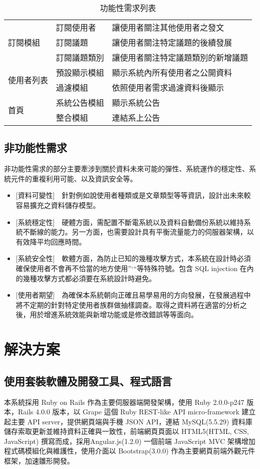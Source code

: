 \documentclass[11pt]{article}
\begin{document}
\begin{table}[t]
\begin{tabular}{ | l | l | l | }
\multirow{3}{*}{訂閱模組}
& 訂閱使用者 & 讓使用者關注其他使用者之發文 \\
& 訂閱議題 & 讓使用者關注特定議題的後續發展 \\
& 訂閱議題類別 & 讓使用者關注特定議題類別的新增議題 \\ \hline
\multirow{2}{*}{使用者列表}
& 預設顯示模組 & 顯示系統內所有使用者之公開資料 \\
& 過濾模組 & 依照使用者需求過濾資料後顯示 \\ \hline
\multirow{2}{*}{首頁}
& 系統公告模組 & 顯示系統公告 \\
& 整合模組 & 連結系上公告 \\ \hline
\end{tabular}
\caption{功能性需求列表}
\label{req}
\end{table}

\subsection{非功能性需求}
非功能性需求的部分主要牽涉到關於資料未來可能的彈性、系統運作的穩定性、系統元件的重複利用可能、以及資訊安全等。
\begin{itemize}
\item{[資料可變性]~~針對例如說使用者種類或是文章類型等等資訊，設計出未來較容易擴充之資料儲存模型。 }
\item{[系統穩定性]~~硬體方面，需配置不斷電系統以及資料自動備份系統以維持系統不斷線的能力。另一方面，也需要設計具有平衡流量能力的伺服器架構，以有效降平均回應時間。}
\item{[系統安全性]~~軟體方面，為防止已知的幾種攻擊方式，本系統在設計時必須確保使用者不會再不恰當的地方使用”‘“等特殊符號。包含 SQL injection 在內的幾種攻擊方式都必須要在系統設計時避免。}
\item{[使用者期望]~~為確保本系統朝向正確且易學易用的方向發展，在發展過程中將不定期的針對特定使用者族群做抽樣調查。取得之資料將在適當的分析之後，用於增進系統效能與新增功能或是修改錯誤等等面向。}
\end{itemize}

\section{解決方案}




\subsection{使用套裝軟體及開發工具、程式語言}
本系統採用 Ruby on Rails 作為主要伺服器端開發架構，使用 Ruby 2.0.0-p247 版本，Rails 4.0.0 版本，以 Grape 這個 Ruby REST-like API micro-framework 建立起主要 API server，提供網頁端與手機 JSON API，連結 MySQL(5.5.29) 資料庫儲存索取更新並維持資料正確與一致性，前端網頁頁面以 HTML5(HTML, CSS, JavaScript) 撰寫而成，採用Angular.js(1.2.0) 一個前端 JavaScript MVC 架構增加程式碼模組化與維護性，使用介面以 Bootstrap(3.0.0) 作為主要網頁前端外觀元件框架，加速雛形開發。
\end{document}
